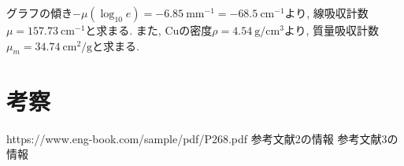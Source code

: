 \documentclass{jarticle}
\begin{document}
グラフの傾き$-\mu(\log_{10}e)=-6.85\ \mathrm{mm}^{-1}=-68.5\ \mathrm{cm}^{-1}$より, 線吸収計数$\mu=157.73\ \mathrm{cm}^{-1}$と求まる.
また, $\mathrm{Cu}$の密度$\rho=4.54\ \mathrm{g}/\mathrm{cm}^3$より\cite{金属の密度}, 質量吸収計数$\mu_m=34.74\ \mathrm{cm}^2/\mathrm{g}$と求まる.



\section{考察}





\begin{thebibliography}{99}

   https://www.eng-book.com/sample/pdf/P268.pdf
   参考文献2の情報
   参考文献3の情報

\end{thebibliography}
\end{document}
